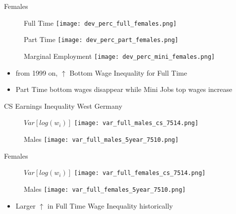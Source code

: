 \documentclass[hyperref={bookmarks=false}]{beamer}
\begin{document}
\begin{appendix}
\begin{frame}{Females}
\begin{figure}[!t]
	\centering
	\begin{minipage}[b]{0.32\textwidth}{Full Time}
		\centering
		\texttt{[image: dev\_perc\_full\_females.png]}
	\end{minipage}
	\begin{minipage}[b]{0.32\textwidth}{Part Time}
		\centering
		\texttt{[image: dev\_perc\_part\_females.png]}
	\end{minipage}
	\begin{minipage}[b]{0.32\textwidth}{Marginal Employment}
		\centering
		\texttt{[image: dev\_perc\_mini\_females.png]}
	\end{minipage}
\end{figure}
\begin{itemize}
	\setlength{\itemsep}{0.7 cm}
	\item from 1999 on, $\uparrow$ Bottom Wage Inequality for Full Time
	\item  Part Time bottom wages disappear while Mini Jobs top wages increase
\end{itemize}
\end{frame}

\begin{frame}{CS Earnings Inequality}
West Germany
\begin{figure}[!t]
\begin{minipage}[b]{0.32\textwidth}{$Var[log(w_i)]$}
\centering
\texttt{[image: var\_full\_males\_cs\_7514.png]}
\end{minipage}
\begin{minipage}[b]{0.32\textwidth}{Males}
\centering
\texttt{[image: var\_full\_males\_5year\_7510.png]}
\end{minipage}
\end{figure}
Females
\begin{figure}[!t]
	\begin{minipage}[b]{0.32\textwidth}{$Var[log(w_i)]$}
		\centering
		\texttt{[image: var\_full\_females\_cs\_7514.png]}
	\end{minipage}
	\begin{minipage}[b]{0.32\textwidth}{Males}
		\centering
		\texttt{[image: var\_full\_females\_5year\_7510.png]}
	\end{minipage}
\end{figure}
\begin{itemize}
\item  Larger $\uparrow$ in Full Time Wage Inequality historically \hyperlink{DATA}{}
\end{itemize}
\end{frame}


\end{appendix}
\end{document}
